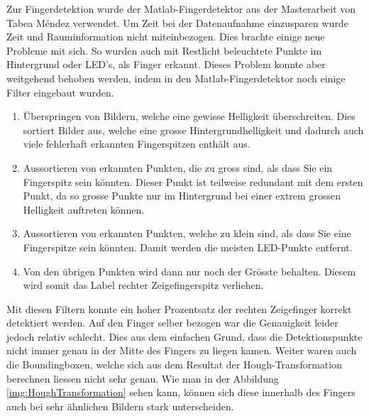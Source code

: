 Zur Fingerdetektion wurde der Matlab-Fingerdetektor aus der Masterarbeit von Tabea Méndez \cite{TabeasFingertracking} verwendet. 
Um Zeit bei der Datenaufnahme einzusparen wurde Zeit und Rauminformation nicht miteinbezogen. 
Dies brachte einige neue Probleme mit sich.   
So wurden auch mit Restlicht beleuchtete Punkte im Hintergrund oder LED's, als Finger erkannt.
Dieses Problem konnte aber weitgehend behoben werden, indem in den Matlab-Fingerdetektor noch einige Filter eingebaut wurden.
\begin{enumerate}
\item Überspringen von Bildern, welche eine gewisse Helligkeit überschreiten. 
Dies sortiert Bilder aus, welche eine grosse Hintergrundhelligkeit und dadurch auch viele fehlerhaft erkannten Fingerspitzen enthält aus.  
\item Aussortieren von erkannten Punkten, die zu gross sind, als dass Sie ein Fingerspitz sein könnten. 
Dieser Punkt ist teilweise redundant mit dem ersten Punkt, da so grosse Punkte nur im Hintergrund bei einer extrem grossen Helligkeit auftreten können.  
\item Aussortieren von erkannten Punkten, welche zu klein sind, als dass Sie eine Fingerspitze sein könnten. 
Damit werden die meisten LED-Punkte entfernt.
\item Von den übrigen Punkten wird dann nur noch der Grösste behalten.
Diesem wird somit das Label \grqq{}rechter Zeigefingerspitz\grqq{} verliehen. 
\end{enumerate}
Mit diesen Filtern konnte ein hoher Prozentsatz der rechten Zeigefinger korrekt detektiert werden.
Auf den Finger selber bezogen war die Genauigkeit leider jedoch relativ schlecht.
Dies aus dem einfachen Grund, dass die Detektionspunkte nicht immer genau in der Mitte des Fingers zu liegen kamen. 
Weiter waren auch die Boundingboxen, welche sich aus dem Resultat der Hough-Transformation \cite{TabeasFingertracking} berechnen liessen nicht sehr genau. 
Wie man in der Abbildung \ref{img:HoughTransformation} sehen kann, können sich diese innerhalb des Fingers auch bei sehr ähnlichen Bildern stark unterscheiden.

